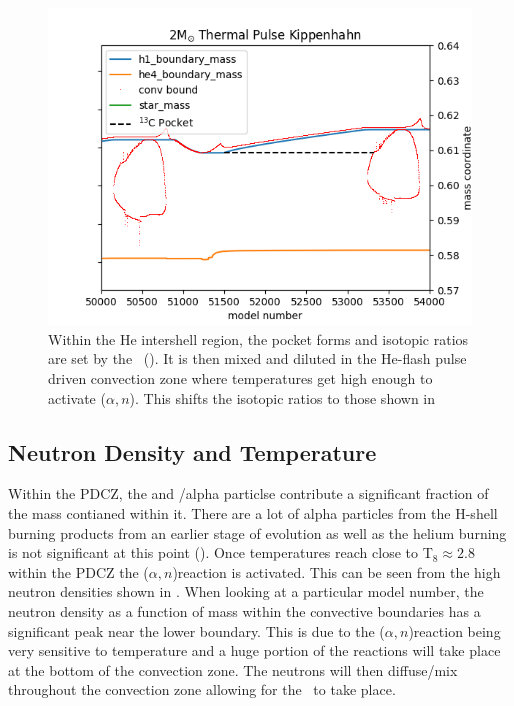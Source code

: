 \documentclass[fleqn,usenatbib]{mnras}
\begin{document}
\begin{figure}
  \includegraphics[width=\columnwidth]{figs/2M_Kippenhahn.png}
  \caption{Within the He intershell region, the \carbon[13] pocket forms and isotopic ratios are set by the \spr~(). It is then mixed and diluted in the He-flash pulse driven convection zone where temperatures get high enough to activate \neon[22]($\alpha,n$)\magnesium[25]. This shifts the isotopic ratios to those shown in } 
\end{figure}

\subsection{Neutron Density and Temperature}
\label{sec:neutron}

Within the PDCZ, the \neon[22] and \helium[4]/alpha particlse contribute a significant fraction of the mass contianed within it. There are a lot of alpha particles from the H-shell burning products from an earlier stage of evolution as well as the helium burning is not significant at this point (). Once temperatures reach close to T$_{8} \approx 2.8$ within the PDCZ the \neon[22]($\alpha,n$)\magnesium[25] reaction is activated. This can be seen from the high neutron densities shown in . When looking at a particular model number, the neutron density as a function of mass within the convective boundaries has a significant peak near the lower boundary. This is due to the \neon[22]($\alpha,n$)\magnesium[25] reaction being very sensitive to temperature and a huge portion of the reactions will take place at the bottom of the convection zone. The neutrons will then diffuse/mix throughout the convection zone allowing for the \spr~to take place. 
\end{document}
